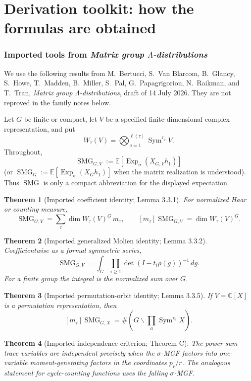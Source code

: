 \documentclass[10pt]{article}
\newcommand{\Sym}{\operatorname{Sym}}
\newcommand{\ExpS}{\operatorname{Exp}_{\sigma}}
\newcommand{\SMG}{\operatorname{SMG}}
\newcommand{\MGF}{\SMG}
\newcommand{\smg}[1]{\mathbb E\!\left[\ExpS\!\left(X_{#1}h_1\right)\right]}
\newcommand{\smgv}[2]{\mathbb E\!\left[\ExpS\!\left(X_{#1,#2}h_1\right)\right]}
\newcommand{\C}{\mathbb C}
\newtheorem{theorem}{Theorem}
\begin{document}
\tableofcontents
\clearpage

\part{Derivation toolkit: how the formulas are obtained}

\section{Imported tools from \emph{Matrix group $\Lambda$-distributions}}
\label{sec:imported-tools}

We use the following results from M.~Bertucci, S.~Van Blarcom,
B.~Glancy, S.~Howe, T.~Madden, B.~Miller, S.~Pal, G.~Papagrigoriou,
N.~Raikman, and T.~Tran, \emph{Matrix group $\Lambda$-distributions},
draft of 14 July 2026. They are not reproved in the family notes below.

Let $G$ be finite or compact, let $V$ be a specified finite-dimensional
complex representation, and put
\[
W_\tau(V)=\bigotimes_{a=1}^{\ell(\tau)}\Sym^{\tau_a}V.
\]
Throughout,
\[
\boxed{\MGF_{G,V}:=\smgv{G}{V}}
\]
(or $\MGF_G:=\smg{G}$ when the matrix realization is understood). Thus
$\MGF$ is only a compact abbreviation for the displayed expectation.

\begin{theorem}[Imported coefficient identity; Lemma 3.3.1]
\label{tool:coefficient}
For normalized Haar or counting measure,
\[
\boxed{\MGF_{G,V}=\sum_\tau \dim W_\tau(V)^G\,m_\tau,\qquad
[m_\tau]\MGF_{G,V}=\dim W_\tau(V)^G.}
\]
\end{theorem}

\begin{theorem}[Imported generalized Molien identity; Lemma 3.3.2]
\label{tool:molien}
Coefficientwise as a formal symmetric series,
\[
\boxed{\MGF_{G,V}=\int_G\prod_{i\ge1}\det(I-t_i\rho(g))^{-1}\,dg.}\label{eq:tool-finite-molien}
\]
For a finite group the integral is the normalized sum over $G$.
\end{theorem}

\begin{theorem}[Imported permutation-orbit identity; Lemma 3.3.5]
\label{tool:permutation-orbits}
If $V=\C[X]$ is a permutation representation, then
\[
[m_\tau]\MGF_{G,X}=\#\!\left(G\backslash
\prod_a\Sym^{\tau_a}X\right).
\]
\end{theorem}

\begin{theorem}[Imported independence criterion; Theorem C]
\label{tool:independence}
The power-sum trace variables are independent precisely when the
$\sigma$-MGF factors into one-variable moment-generating factors in the
coordinates $p_r/r$. The analogous statement for cycle-counting functions
uses the falling $\sigma$-MGF.
\end{theorem}
\end{document}
